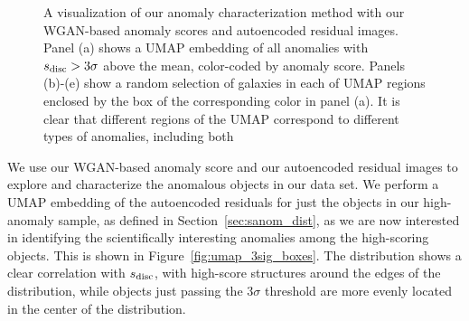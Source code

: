 \begin{figure}
  \vspace{0cm}
  \caption{A visualization of our anomaly characterization method with our WGAN-based anomaly scores and autoencoded residual images. Panel (a) shows a UMAP embedding of all anomalies with  $s_\mathrm{disc}>3\sigma$ above the mean, color-coded by anomaly score. Panels (b)-(e) show a random selection of galaxies in each of UMAP regions enclosed by the box of the corresponding color in panel (a). It is clear that different regions of the UMAP correspond to different types of anomalies, including both }
  \label{fig:boxes}
\end{figure}

We use our WGAN-based anomaly score and our autoencoded residual images to explore and characterize the anomalous objects in our data set.
We perform a UMAP embedding of the autoencoded residuals for just the objects in our high-anomaly sample, as defined in Section~\ref{sec:sanom_dist}, as we are now interested in identifying the scientifically interesting anomalies among the high-scoring objects.
This is shown in Figure~\ref{fig:umap_3sig_boxes}.
The distribution shows a clear correlation with $s_\mathrm{disc}$, with high-score structures around the edges of the distribution, while objects just passing the $3\sigma$ threshold are more evenly located in the center of the distribution.

